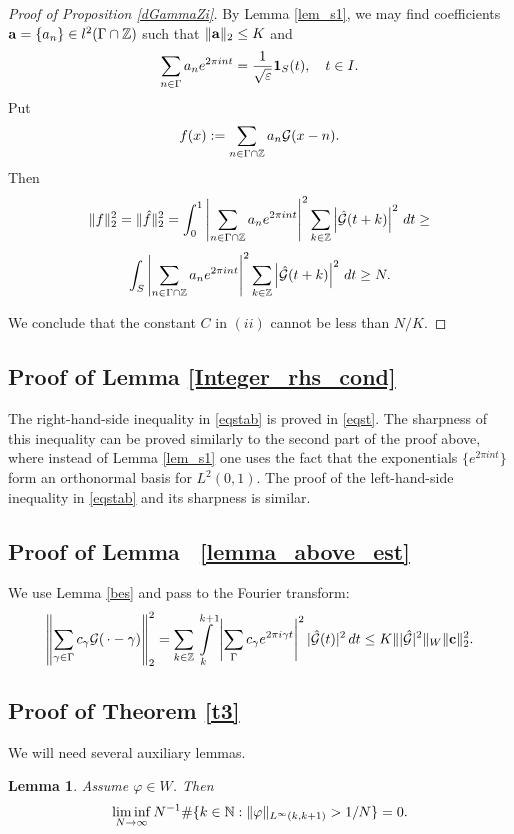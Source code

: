 \documentclass[12pt]{amsart}
\numberwithin{equation}{section}
\newtheorem{lemma}[theorem]{Lemma}
\begin{document}
\begin{proof}[Proof of Proposition \ref{dGammaZi}]
By Lemma \ref{lem_s1}, we may find coefficients ${\bf a}=\{a_n\}\in l^2(\Gamma\cap{\mathbb Z})$ such that $\|{\bf a}\|_2\leq K$ and
$$\sum_{n\in\Gamma}a_ne^{2\pi i n t}=\frac{1}{\sqrt\varepsilon}{\bf 1}_S(t),\quad t\in I.$$
Put
$$f(x):=\sum_{n\in\Gamma\cap{\mathbb Z}}a_n \mathcal{G}(x-n).$$Then
$$\|f\|_2^2=\|\hat f\|_2^2=\int_0^1 \left|\sum_{n\in\Gamma\cap{\mathbb Z}}a_ne^{2\pi i n t}\right|^2\sum_{k\in{\mathbb Z}}\left|\hat{\mathcal{G}}(t+k)\right|^2\,dt\geq $$
$$\int_S \left|\sum_{n\in\Gamma\cap{\mathbb Z}}a_ne^{2\pi i n t}\right|^2\sum_{k\in{\mathbb Z}}\left|\hat{\mathcal{G}}(t+k)\right|^2\,dt\ge N.$$

We conclude that the constant $C$ in  $(ii)$ cannot be less than $N/K$.
\end{proof}



\subsection{Proof of Lemma \ref{Integer_rhs_cond}} The right-hand-side inequality in 
\eqref{eqstab}  is proved in \eqref{eqst}. The sharpness of this inequality can be proved similarly to the second part of the proof above, where instead of Lemma \ref{lem_s1} one uses the fact that the exponentials $\{e^{2\pi i n t}\}$ form an orthonormal basis for $L^2(0,1)$. The proof of the left-hand-side inequality in \eqref{eqstab} and its sharpness is similar.

\subsection{Proof of Lemma ~\ref{lemma_above_est}}
We use Lemma \ref{bes} and  pass  to the Fourier transform:
$$
 \left\|\sum_{\gamma \in \Gamma} c_{\gamma} \mathcal{G}(\,\cdot - \gamma) \right\|^2_2 = \sum_{k \in  {\mathbb Z}} \int\limits_{k}^{k+1} \left|\sum\limits_{\Gamma} c_{\gamma} e^{2\pi i \gamma t}\right|^2 |\hat{\mathcal{G}}(t)|^2 \, dt  \le K \| |\hat{\mathcal{G}}|^2\|_W \|{\bf c}\|^2_2.
$$




\subsection{Proof of Theorem \ref{t3}} 

 We will need several auxiliary lemmas.
\begin{lemma}\label{l1}
    Assume $\varphi\in W$. Then
    $$\liminf_{N\to\infty}N^{-1}\#\{k\in{\mathbb N}: \|\varphi\|_{L^\infty(k,k+1)}>1/N\}=0.$$
\end{lemma}
\end{document}
